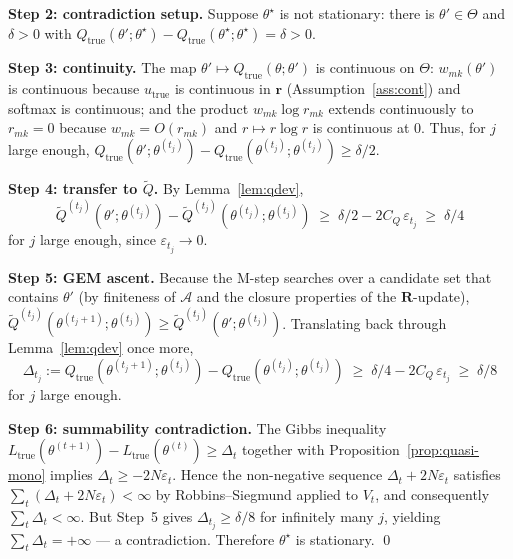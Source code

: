 \textbf{Step 2: contradiction setup.} Suppose $\theta^{\star}$ is not
stationary: there is $\theta'\in\Theta$ and $\delta > 0$ with
$Q_{\mathrm{true}}(\theta';\theta^{\star}) -
Q_{\mathrm{true}}(\theta^{\star};\theta^{\star}) = \delta > 0$.

\textbf{Step 3: continuity.} The map $\theta'\mapsto Q_{\mathrm{true}}(\theta;\theta')$
is continuous on $\Theta$: $w_{mk}(\theta')$ is continuous because
$u_{\mathrm{true}}$ is continuous in $\mathbf{r}$
(Assumption~\ref{ass:cont}) and softmax is continuous; and the
product $w_{mk}\log r_{mk}$ extends continuously to $r_{mk} = 0$
because $w_{mk} = O(r_{mk})$ and $r\mapsto r\log r$ is continuous at
$0$. Thus, for $j$ large enough,
$Q_{\mathrm{true}}(\theta';\theta^{(t_j)}) -
Q_{\mathrm{true}}(\theta^{(t_j)};\theta^{(t_j)}) \geq \delta/2$.

\textbf{Step 4: transfer to $\tilde Q$.} By Lemma~\ref{lem:qdev},
\begin{equation*}
\tilde Q^{(t_j)}(\theta';\theta^{(t_j)}) -
\tilde Q^{(t_j)}(\theta^{(t_j)};\theta^{(t_j)}) \;\geq\;
\delta/2 - 2C_Q\,\varepsilon_{t_j} \;\geq\; \delta/4
\end{equation*}
for $j$ large enough, since $\varepsilon_{t_j}\to 0$.

\textbf{Step 5: GEM ascent.} Because the M-step searches over a
candidate set that contains $\theta'$ (by finiteness of $\mathcal{A}$
and the closure properties of the $\mathbf{R}$-update),
$\tilde Q^{(t_j)}(\theta^{(t_j+1)};\theta^{(t_j)}) \geq
\tilde Q^{(t_j)}(\theta';\theta^{(t_j)})$. Translating back through
Lemma~\ref{lem:qdev} once more,
\begin{equation*}
\Delta_{t_j} := Q_{\mathrm{true}}(\theta^{(t_j+1)};\theta^{(t_j)}) -
Q_{\mathrm{true}}(\theta^{(t_j)};\theta^{(t_j)}) \;\geq\;
\delta/4 - 2C_Q\,\varepsilon_{t_j} \;\geq\; \delta/8
\end{equation*}
for $j$ large enough.

\textbf{Step 6: summability contradiction.} The Gibbs inequality
$L_{\mathrm{true}}(\theta^{(t+1)}) - L_{\mathrm{true}}(\theta^{(t)})
\geq \Delta_t$ together with Proposition~\ref{prop:quasi-mono}
implies $\Delta_t \geq -2N\varepsilon_t$. Hence the non-negative
sequence $\Delta_t + 2N\varepsilon_t$ satisfies
$\sum_t (\Delta_t + 2N\varepsilon_t) < \infty$ by
Robbins--Siegmund applied to $V_t$, and consequently
$\sum_t \Delta_t < \infty$. But Step~5 gives $\Delta_{t_j} \geq
\delta/8$ for infinitely many $j$, yielding $\sum_t \Delta_t = +\infty$
--- a contradiction. Therefore $\theta^{\star}$ is stationary. \qed

